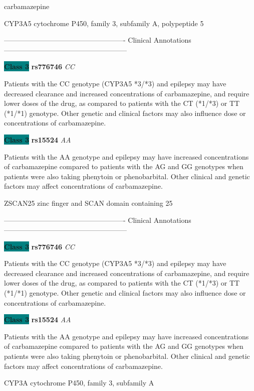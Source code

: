 \documentclass{resume} %
\begin{document}
\begin{rSection}{ carbamazepine }
\begin{rSubsection}{ CYP3A5 }{ cytochrome P450, family 3, subfamily A, polypeptide 5 }{}{}
\item[] ---------------------------------------------------- Clinical Annotations -----------------------------------------------------\newline
\item \textbf{\colorbox{teal} {Class 3}} \textbf{ rs776746 } \textit{ CC }
\item[] Patients with the CC genotype (CYP3A5 *3/*3) and epilepsy may have decreased clearance and increased concentrations of carbamazepine, and require lower doses of the drug, as compared to patients with the CT (*1/*3) or TT (*1/*1) genotype. Other genetic and clinical factors may also influence dose or concentrations of carbamazepine.\item \textbf{\colorbox{teal} {Class 3}} \textbf{ rs15524 } \textit{ AA }
\item[] Patients with the AA genotype and epilepsy may have increased concentrations of carbamazepine compared to patients with the AG and GG genotypes when patients were also taking phenytoin or phenobarbital. Other clinical and genetic factors may affect concentrations of carbamazepine. 
\end{rSubsection}\begin{rSubsection}{ ZSCAN25 }{ zinc finger and SCAN domain containing 25 }{}{}
\item[]

\item[] ---------------------------------------------------- Clinical Annotations -----------------------------------------------------\newline
\item \textbf{\colorbox{teal} {Class 3}} \textbf{ rs776746 } \textit{ CC }
\item[] Patients with the CC genotype (CYP3A5 *3/*3) and epilepsy may have decreased clearance and increased concentrations of carbamazepine, and require lower doses of the drug, as compared to patients with the CT (*1/*3) or TT (*1/*1) genotype. Other genetic and clinical factors may also influence dose or concentrations of carbamazepine.\item \textbf{\colorbox{teal} {Class 3}} \textbf{ rs15524 } \textit{ AA }
\item[] Patients with the AA genotype and epilepsy may have increased concentrations of carbamazepine compared to patients with the AG and GG genotypes when patients were also taking phenytoin or phenobarbital. Other clinical and genetic factors may affect concentrations of carbamazepine. 
\end{rSubsection}\begin{rSubsection}{ CYP3A }{ cytochrome P450, family 3, subfamily A }{}{}
\item[]


\end{rSubsection}
\end{rSection}
\end{document}
